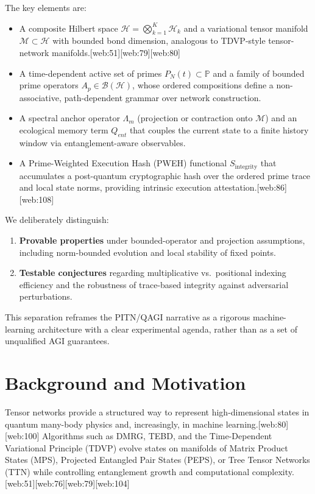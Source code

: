 \documentclass[11pt]{article}
\begin{document}
The key elements are:
\begin{itemize}[leftmargin=*]
  \item A composite Hilbert space \( \mathcal{H} = \bigotimes_{k=1}^K \mathcal{H}_k \) and a variational tensor manifold \( \mathcal{M} \subset \mathcal{H} \) with bounded bond dimension, analogous to TDVP-style tensor-network manifolds.[web:51][web:79][web:80]
  \item A time-dependent active set of primes \( P_N(t) \subset \mathbb{P} \) and a family of bounded prime operators \( A_p \in \mathcal{B}(\mathcal{H}) \), whose ordered compositions define a non-associative, path-dependent grammar over network construction.
  \item A spectral anchor operator \( \Lambda_m \) (projection or contraction onto \( \mathcal{M} \)) and an ecological memory term \( Q_{ent} \) that couples the current state to a finite history window via entanglement-aware observables.
  \item A Prime-Weighted Execution Hash (PWEH) functional \( S_{\text{integrity}} \) that accumulates a post-quantum cryptographic hash over the ordered prime trace and local state norms, providing intrinsic execution attestation.[web:86][web:108]
\end{itemize}

We deliberately distinguish:
\begin{enumerate}[leftmargin=*]
  \item \textbf{Provable properties} under bounded-operator and projection assumptions, including norm-bounded evolution and local stability of fixed points.
  \item \textbf{Testable conjectures} regarding multiplicative vs.\ positional indexing efficiency and the robustness of trace-based integrity against adversarial perturbations.
\end{enumerate}

This separation reframes the PITN/QAGI narrative as a rigorous machine-learning architecture with a clear experimental agenda, rather than as a set of unqualified AGI guarantees.

\section{Background and Motivation}

Tensor networks provide a structured way to represent high-dimensional states in quantum many-body physics and, increasingly, in machine learning.[web:80][web:100] Algorithms such as DMRG, TEBD, and the Time-Dependent Variational Principle (TDVP) evolve states on manifolds of Matrix Product States (MPS), Projected Entangled Pair States (PEPS), or Tree Tensor Networks (TTN) while controlling entanglement growth and computational complexity.[web:51][web:76][web:79][web:104]
\end{document}
